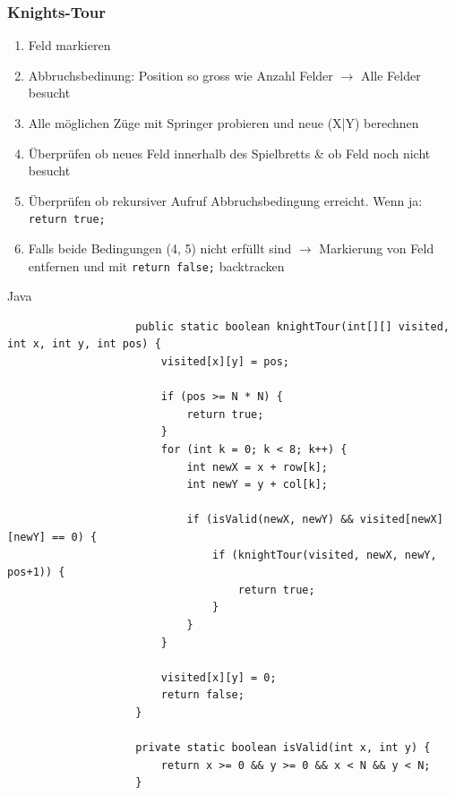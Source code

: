 \documentclass[a4paper, landscape, 8pt]{scrartcl}
\begin{document}
\begin{multicols*}{4}
                \subsubsection{Knights-Tour}
                    \begin{enumerate}
                        \item Feld markieren
                        \item Abbruchsbedinung: Position so gross wie Anzahl Felder $\to$ Alle Felder besucht
                        \item Alle möglichen Züge mit Springer probieren und neue (X|Y) berechnen
                        \item Überprüfen ob neues Feld innerhalb des Spielbretts \& ob Feld noch nicht besucht
                        \item Überprüfen ob rekursiver Aufruf Abbruchsbedingung erreicht. Wenn ja: \texttt{return true;}
                        \item Falls beide Bedingungen (4, 5) nicht erfüllt sind $\to$ Markierung von Feld entfernen
                        und mit \texttt{return false;} backtracken
                    \end{enumerate}
                    \textcolor{subsectioncolor}{Java}
                    \begin{lstlisting}
                    public static boolean knightTour(int[][] visited, int x, int y, int pos) {
                        visited[x][y] = pos;

                        if (pos >= N * N) {
                            return true;
                        }
                        for (int k = 0; k < 8; k++) {
                            int newX = x + row[k];
                            int newY = y + col[k];

                            if (isValid(newX, newY) && visited[newX][newY] == 0) {
                                if (knightTour(visited, newX, newY, pos+1)) {
                                    return true;
                                }
                            }
                        }

                        visited[x][y] = 0;
                        return false;
                    }

                    private static boolean isValid(int x, int y) {
                        return x >= 0 && y >= 0 && x < N && y < N;
                    }
                    \end{lstlisting}


\end{multicols*}
\end{document}
